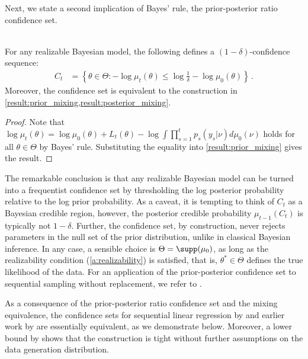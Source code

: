 Next, we state a second implication of Bayes' rule, the prior-posterior ratio confidence set. 
\begin{lemma} \label{lem:posterior_ratio_confidence_set}\\
    For any realizable Bayesian model, the following defines a $(1-\delta)$-confidence sequence:
\begin{align*}
    C_t &=  \left\{ \theta \in \Theta: - \log \mu_t(\theta) \leq  \log \frac{1}{\delta} - \log \mu_0(\theta) \right\} \,.
\end{align*}
Moreover, the confidence set is equivalent to the construction in \cref{result:prior_mixing,result:posterior_mixing}.
\end{lemma}
\begin{proof}
    Note that $\log \mu_t(\theta) = \log \mu_0(\theta)  + L_t(\theta) - \log \int \prod_{s=1}^t p_s(y_s|\nu) d\mu_{0}(\nu)$ holds for all $\theta \in \Theta$ by Bayes' rule. Substituting the equality into \cref{result:prior_mixing} gives the result.
\end{proof}
The remarkable conclusion is that any realizable Bayesian model can be turned into a frequentist confidence set by thresholding the log posterior probability relative to the log prior probability. As a caveat, it is tempting to think of $C_t$ as a Bayesian credible region, however, the posterior credible probability $\mu_{t-1}(C_t)$ is typically not $1-\delta$. Further, the confidence set, by construction, never rejects parameters in the null set of the prior distribution, unlike in classical Bayesian inference. In any case, a sensible choice is $\Theta = \supp(\mu_0)$, as long as the realizability condition (\cref{a:realizability}) is satisfied, that is, $\theta^* \in \Theta$ defines the true likelihood of the data. For an application of the prior-posterior confidence set to sequential sampling without replacement, we refer to \citet{waudby2020confidence}.

As a consequence of the prior-posterior ratio confidence set and the mixing equivalence, the confidence sets for sequential linear regression by \citet{neiswanger2021uncertainty,flynn2024improved,flynn2024tighter} and earlier work by \cite{abbasi2011improved} are essentially equivalent, as we demonstrate below. Moreover, a lower bound by \citet{lattimore2020bandit} shows that the construction is tight without further assumptions on the data generation distribution. 

